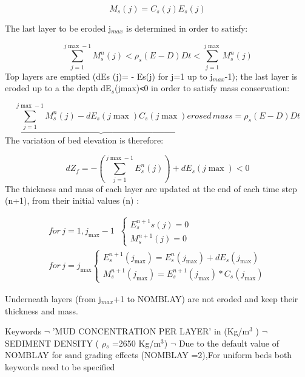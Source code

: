 \begin{equation*}
M_{s} (j)=C_{s} (j)E_{s} (j) 
\end{equation*}

The last layer to be eroded j$_{max}$ is determined in order to satisfy:

\begin{equation*}
\sum\limits_{j=1}^{j\max -1}M_{s}^{n} (j) <\rho _{s} (E^{}
-D)Dt<\sum\limits_{j=1}^{j\max }M_{s}^{n} (j) 
\end{equation*}
Top layers are emptied (dEs (j)= - Es(j) for j=1 up to j$_{max}$-1); the
last layer is eroded up to a the depth dE$_{s}$(jmax)\texttt{<}0 in order to
satisfy mass conservation:

\begin{equation*}
\underbrace{\sum\limits_{j=1}^{j\max -1}M_{s}^{n} (j) -dE_{s} (j\max )C_{s}
(j\max )} erosed\,mass=\rho _{s} (E-D)Dt 
\end{equation*}
The variation of bed elevation is therefore:

\begin{equation*}
dZ_{f} =-\left( \sum\limits_{j=1}^{j\max -1}E_{s}^{n} (j) \right) +dE_{s}
(j\max )<0 
\end{equation*}
The thickness and mass of each layer are updated at the end of each time
step (n+1), from their initial values (n) :

\begin{gather*}
for\,j=1,j_{\max } -1\;\;\left\{ 
\begin{array}{l}
E_{s}^{n+1} s(j)=0 \\ 
M_{s}^{n+1} (j)=0%
\end{array}
\right. \;\; \\
for\,j=j_{\max } \left\{ 
\begin{array}{l}
E_{s}^{n+1} (j_{\max } )=E_{s}^{n} (j_{\max } )+dE_{s}^{} (j_{\max } ) \\ 
M_{s}^{n+1} (j_{\max } )=E_{s}^{n+1} (j_{\max } )*C_{s} (j_{\max } )%
\end{array}
\right.
\end{gather*}

Underneath layers (from j$_{max}$+1 to NOMBLAY) are not eroded and keep
their thickness and mass.

Keywords \newline
$\neg$\hspace{5mm} 'MUD CONCENTRATION PER LAYER' in (Kg/m$^{3}$ )\newline
$\neg$\hspace{5mm} SEDIMENT DENSITY ( $\rho$$_{s}$ =2650 Kg/m$^{3}$)\newline
$\neg$\hspace{5mm} Due to the default value of NOMBLAY for sand grading
effects (NOMBLAY =2),For uniform beds both keywords need to be specified

